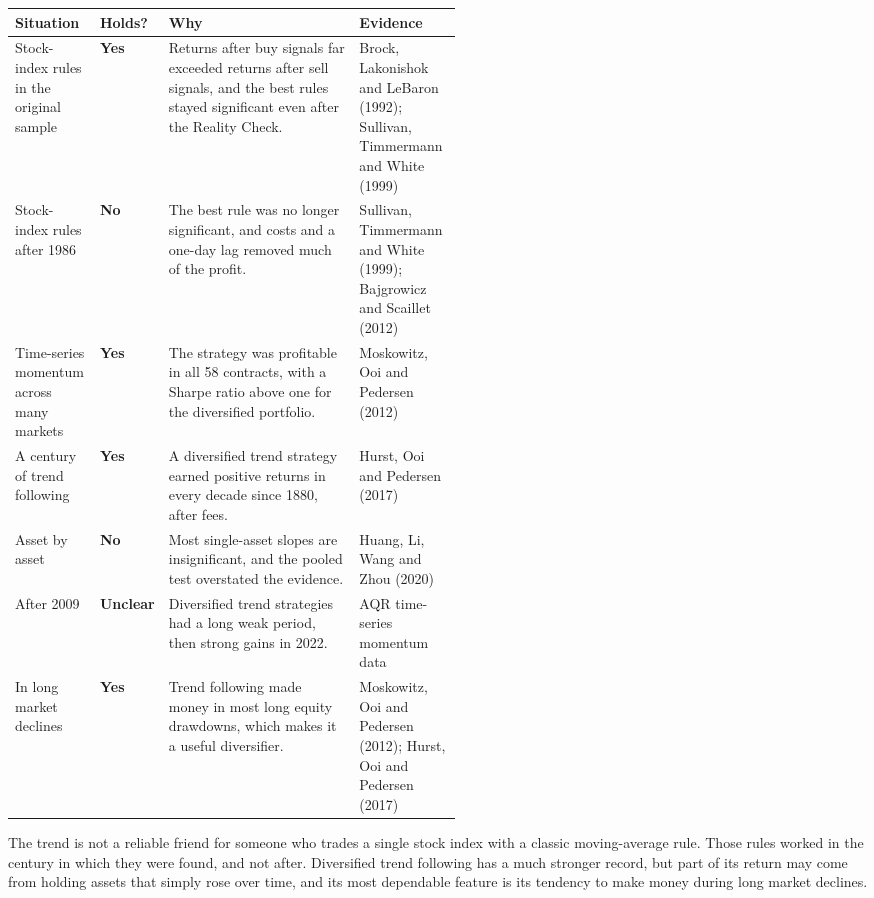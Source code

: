 \begin{center}
\small
\begin{tabularx}{\linewidth}{@{}>{\raggedright\arraybackslash}p{0.19\linewidth}>{\raggedright\arraybackslash}p{0.10\linewidth}>{\raggedright\arraybackslash}X>{\raggedright\arraybackslash}p{0.23\linewidth}@{}}
\toprule
Situation & Holds? & Why & Evidence \\
\midrule
Stock-index rules in the original sample & \textbf{Yes} & Returns after buy signals far exceeded returns after sell signals, and the best rules stayed significant even after the Reality Check. & Brock, Lakonishok and LeBaron (1992); Sullivan, Timmermann and White (1999) \\
\addlinespace[3pt]
Stock-index rules after 1986 & \textbf{No} & The best rule was no longer significant, and costs and a one-day lag removed much of the profit. & Sullivan, Timmermann and White (1999); Bajgrowicz and Scaillet (2012) \\
\addlinespace[3pt]
Time-series momentum across many markets & \textbf{Yes} & The strategy was profitable in all 58 contracts, with a Sharpe ratio above one for the diversified portfolio. & Moskowitz, Ooi and Pedersen (2012) \\
\addlinespace[3pt]
A century of trend following & \textbf{Yes} & A diversified trend strategy earned positive returns in every decade since 1880, after fees. & Hurst, Ooi and Pedersen (2017) \\
\addlinespace[3pt]
Asset by asset & \textbf{No} & Most single-asset slopes are insignificant, and the pooled test overstated the evidence. & Huang, Li, Wang and Zhou (2020) \\
\addlinespace[3pt]
After 2009 & \textbf{Unclear} & Diversified trend strategies had a long weak period, then strong gains in 2022. & AQR time-series momentum data \\
\addlinespace[3pt]
In long market declines & \textbf{Yes} & Trend following made money in most long equity drawdowns, which makes it a useful diversifier. & Moskowitz, Ooi and Pedersen (2012); Hurst, Ooi and Pedersen (2017) \\
\bottomrule
\end{tabularx}
\end{center}

The trend is not a reliable friend for someone who trades a single stock index with a classic moving-average rule. Those rules worked in the century in which they were found, and not after. Diversified trend following has a much stronger record, but part of its return may come from holding assets that simply rose over time, and its most dependable feature is its tendency to make money during long market declines.

